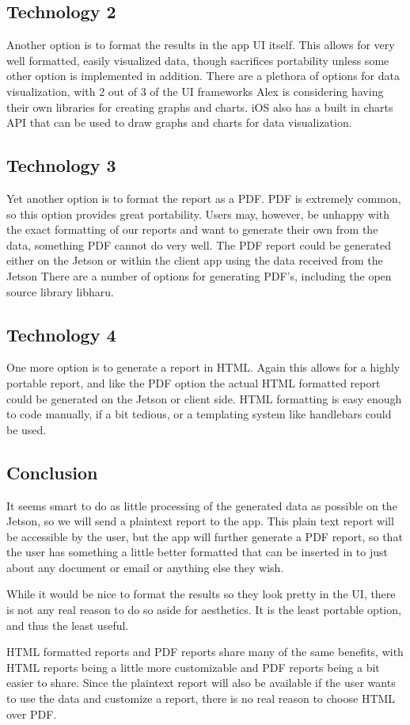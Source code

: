 \documentclass[onecolumn, draftclsnofoot,10pt, compsoc]{IEEEtran}
\begin{document}
\subsection{Technology 2}
Another option is to format the results in the app UI itself.
This allows for very well formatted, easily visualized data, though sacrifices portability unless some other option is implemented in addition.
There are a plethora of options for data visualization, with 2 out of 3 of the UI frameworks Alex is considering having their own libraries for creating graphs and charts.
iOS also has a built in charts API that can be used to draw graphs and charts for data visualization.

\subsection{Technology 3}
Yet another option is to format the report as a PDF.
PDF is extremely common, so this option provides great portability. 
Users may, however, be unhappy with the exact formatting of our reports and want to generate their own from the data, something PDF cannot do very well.
The PDF report could be generated either on the Jetson or within the client app using the data received from the Jetson
There are a number of options for generating PDF's, including the open source library libharu.

\subsection{Technology 4}
One more option is to generate a report in HTML.
Again this allows for a highly portable report, and like the PDF option the actual HTML formatted report could be generated on the Jetson or client side.
HTML formatting is easy enough to code manually, if a bit tedious, or a templating system like handlebars could be used.

\subsection{Conclusion}
It seems smart to do as little processing of the generated data as possible on the Jetson, so we will send a plaintext report to the app. This plain text report will be accessible by the user, but the app will further generate a PDF report, so that the user has something a little better formatted that can be inserted in to just about any document or email or anything else they wish.

While it would be nice to format the results so they look pretty in the UI, there is not any real reason to do so aside for aesthetics. It is the least portable option, and thus the least useful.

HTML formatted reports and PDF reports share many of the same benefits, with HTML reports being a little more customizable and PDF reports being a bit easier to share. Since the plaintext report will also be available if the user wants to use the data and customize a report, there is no real reason to choose HTML over PDF. 
\end{document}
